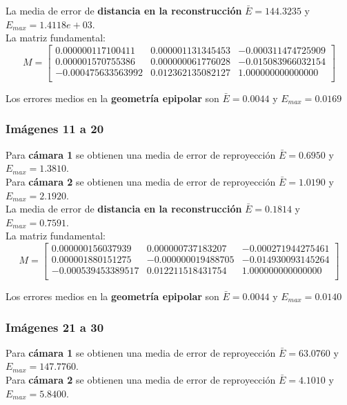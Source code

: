 \documentclass[a4paper, fontsize=11pt]{scrartcl} %
\numberwithin{equation}{section} %
\numberwithin{figure}{section} %
\numberwithin{table}{section} %
\begin{document}
	La media de error de \textbf{distancia en la reconstrucción} $\bar{E} = 144.3235$ y $E_{max} = 1.4118e+03$.\\
	La matriz fundamental:
	\[
	M=
	\begin{bmatrix}
	0.000000117100411&	0.000001131345453&	-0.000311474725909 \\
	0.000001570755386&	0.000000061776028&	-0.015083966032154 \\
	-0.000475633563992&	0.012362135082127&	1.000000000000000  \\
	
	\end{bmatrix}
	\]
	
	Los errores medios en la \textbf{geometría epipolar} son $\bar{E} = 0.0044$ y $E_{max} = 0.0169$
	
	\subsubsection*{Imágenes 11 a 20}
	
	Para \textbf{cámara 1} se obtienen una media de error de reproyección $\bar{E} = 0.6950$ y $E_{max} = 1.3810$.\\
	Para \textbf{cámara 2} se obtienen una media de error de reproyección $\bar{E} = 1.0190$ y $E_{max} = 2.1920$.\\
	
	La media de error de \textbf{distancia en la reconstrucción} $\bar{E} = 0.1814$ y $E_{max} = 0.7591$.\\
	La matriz fundamental:
	\[
	M=
	\begin{bmatrix}
	0.000000156037939&	0.000000737183207&	-0.000271944275461 \\
	0.000001880151275&	-0.000000019488705&	-0.014930093145264 \\
	-0.000539453389517&	0.012211518431754&	1.000000000000000  \\
	
	\end{bmatrix}
	\]
	
	Los errores medios en la \textbf{geometría epipolar} son $\bar{E} = 0.0044$ y $E_{max} = 0.0140$
	
	\subsubsection*{Imágenes 21 a 30}
	
	Para \textbf{cámara 1} se obtienen una media de error de reproyección $\bar{E} = 63.0760$ y $E_{max} = 147.7760$.\\
	Para \textbf{cámara 2} se obtienen una media de error de reproyección $\bar{E} = 4.1010$ y $E_{max} = 5.8400$.\\
	
\end{document}
